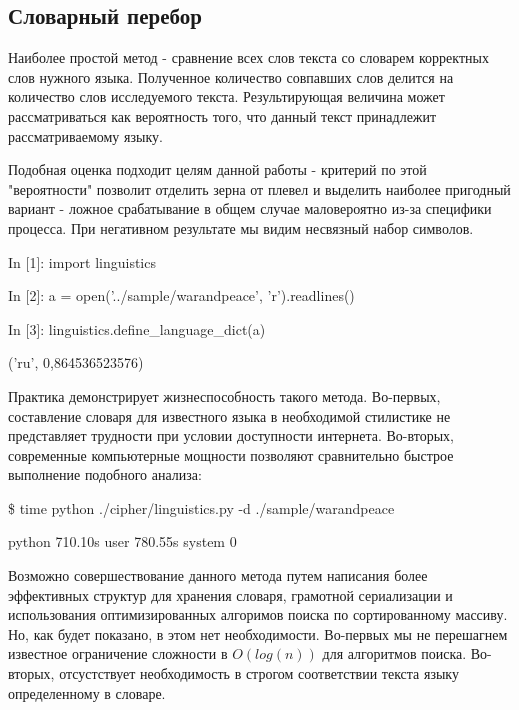 \subsection{Словарный перебор}
Наиболее простой метод - сравнение всех слов текста со словарем 
корректных слов нужного языка. Полученное количество совпавших слов
делится на количество слов исследуемого текста. Результирующая 
величина может рассматриваться как вероятность того, что данный 
текст принадлежит рассматриваемому языку.

Подобная оценка подходит целям данной работы - критерий по 
этой "вероятности" позволит отделить зерна от плевел и выделить 
наиболее пригодный вариант - ложное срабатывание в общем случае 
маловероятно из-за специфики процесса. При негативном результате мы видим 
несвязный набор символов.


In [1]: import linguistics

In [2]: a = open('../sample/warandpeace', 'r').readlines()

In [3]: linguistics.define\_language\_dict(a)

('ru', 0,864536523576)

Практика демонстрирует жизнеспособность такого метода. Во-первых, составление 
словаря для известного языка в необходимой стилистике не представляет 
трудности при условии доступности интернета. Во-вторых, современные 
компьютерные мощности позволяют сравнительно быстрое выполнение 
подобного анализа:

\$ time python ./cipher/linguistics.py -d ./sample/warandpeace 

python  710.10s user 780.55s system 0%

Возможно совершествование данного метода путем написания более 
эффективных структур для хранения словаря, грамотной сериализации и 
использования оптимизированных алгоримов поиска по сортированному 
массиву. Но, как будет показано, в этом нет необходимости.
Во-первых мы не перешагнем известное ограничение сложности в 
$O(log(n))$ для алгоритмов поиска. Во-вторых, отсустствует необходимость 
в строгом соответствии текста языку определенному в словаре.
